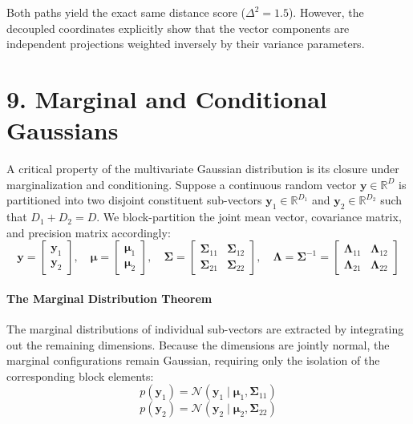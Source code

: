 \documentclass{article}
\begin{document}
Both paths yield the exact same distance score ($\Delta^2 = 1.5$). However, the decoupled coordinates explicitly show that the vector components are independent projections weighted inversely by their variance parameters.

\section*{9. Marginal and Conditional Gaussians}

A critical property of the multivariate Gaussian distribution is its closure under marginalization and conditioning. Suppose a continuous random vector $\mathbf{y} \in \mathbb{R}^D$ is partitioned into two disjoint constituent sub-vectors $\mathbf{y}_1 \in \mathbb{R}^{D_1}$ and $\mathbf{y}_2 \in \mathbb{R}^{D_2}$ such that $D_1 + D_2 = D$. We block-partition the joint mean vector, covariance matrix, and precision matrix accordingly:
\begin{equation}
\mathbf{y} = \begin{bmatrix} \mathbf{y}_1 \\ \mathbf{y}_2 \end{bmatrix}, \quad \boldsymbol{\mu} = \begin{bmatrix} \boldsymbol{\mu}_1 \\ \boldsymbol{\mu}_2 \end{bmatrix}, \quad \boldsymbol{\Sigma} = \begin{bmatrix} \boldsymbol{\Sigma}_{11} & \boldsymbol{\Sigma}_{12} \\ \boldsymbol{\Sigma}_{21} & \boldsymbol{\Sigma}_{22} \end{bmatrix}, \quad \boldsymbol{\Lambda} = \boldsymbol{\Sigma}^{-1} = \begin{bmatrix} \boldsymbol{\Lambda}_{11} & \boldsymbol{\Lambda}_{12} \\ \boldsymbol{\Lambda}_{21} & \boldsymbol{\Lambda}_{22} \end{bmatrix} \tag{16}
\end{equation}

\paragraph{The Marginal Distribution Theorem}
The marginal distributions of individual sub-vectors are extracted by integrating out the remaining dimensions. Because the dimensions are jointly normal, the marginal configurations remain Gaussian, requiring only the isolation of the corresponding block elements:
\begin{equation}
p(\mathbf{y}_1) = \mathcal{N}(\mathbf{y}_1 \mid \boldsymbol{\mu}_1, \boldsymbol{\Sigma}_{11}) \tag{17}
\end{equation}
\begin{equation}
p(\mathbf{y}_2) = \mathcal{N}(\mathbf{y}_2 \mid \boldsymbol{\mu}_2, \boldsymbol{\Sigma}_{22}) \tag{18}
\end{equation}
\end{document}

